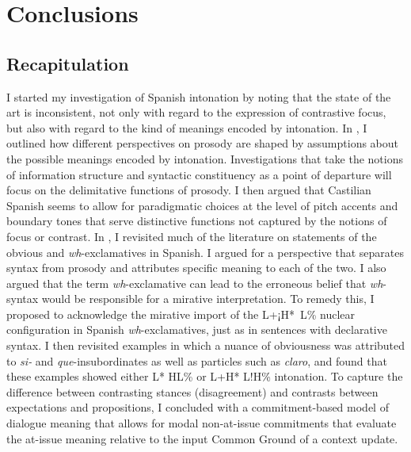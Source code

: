 \chapter{Conclusions}\label{ch:7} %

\section{Recapitulation}\label{ch:7.1}

I started my investigation of Spanish intonation by noting that the state of the art is inconsistent, not only with regard to the expression of contrastive focus, but also with regard to the kind of meanings encoded by intonation. 
In , I outlined how different perspectives on prosody are shaped by assumptions about the possible meanings encoded by intonation. Investigations that take the notions of information structure and syntactic constituency as a point of departure will focus on the delimitative functions of prosody. I then argued that Castilian Spanish seems to allow for paradigmatic choices at the level of pitch accents and boundary tones that serve distinctive functions not captured by the notions of focus or contrast. In , I revisited much of the literature on statements of the obvious and \textit{wh}-exclamatives in Spanish. I argued for a perspective that separates syntax from prosody and attributes specific meaning to each of the two. I also argued that the term \textit{wh}-exclamative can lead to the erroneous belief that \textit{wh}-syntax would be responsible for a mirative interpretation. To remedy this, I proposed to acknowledge the mirative import of the L+¡H*~L\% nuclear configuration in Spanish \textit{wh}-exclamatives, just as in sentences with declarative syntax. I then revisited examples in which a nuance of obviousness was attributed to \textit{si-} and \textit{que}-insubordinates as well as particles such as \textit{claro}, and found that these examples showed either L* HL\% or L+H* L!H\% intonation. To capture the difference between contrasting stances (disagreement) and contrasts between expectations and propositions, I concluded  with a commitment-based model of dialogue meaning that allows for modal non-at-issue commitments that evaluate the at-issue meaning relative to the input Common Ground of a context update.

